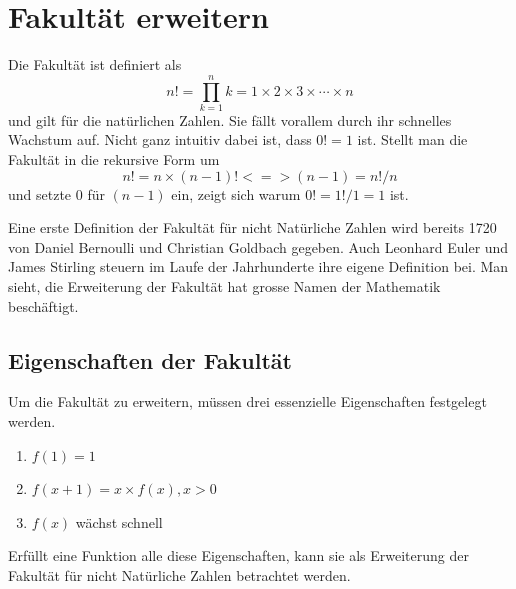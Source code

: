 %
%
%
%
\section{Fakultät erweitern\label{gamma:section:teil0}}

Die Fakultät ist definiert als
\begin{equation}
n! = \prod_{k=1}^{n} k = 1 \times 2 \times 3 \times \cdots \times n
\label{gamma:fakultaet}
\end{equation}
und gilt für die natürlichen Zahlen. Sie fällt vorallem durch ihr schnelles Wachstum auf.
Nicht ganz intuitiv dabei ist, dass $0! = 1$ ist. Stellt man die Fakultät in die rekursive Form um
\begin{equation}
n! = n \times (n-1)! <=> (n-1) = n!/n
\label{gamma:fakultaet-rekursiv}
\end{equation}
und setzte 0 für $(n-1)$ ein, zeigt sich warum $0! = 1!/1 = 1$ ist. 

Eine erste Definition der Fakultät für nicht Natürliche Zahlen wird bereits 1720 von Daniel Bernoulli und Christian Goldbach gegeben. 
Auch Leonhard Euler und James Stirling steuern im Laufe der Jahrhunderte ihre eigene Definition bei. 
Man sieht, die Erweiterung der Fakultät hat grosse Namen der Mathematik beschäftigt. 

\subsection{Eigenschaften der Fakultät}

Um die Fakultät zu erweitern, müssen drei essenzielle Eigenschaften festgelegt werden. 
\begin{enumerate}
  \item $f(1) = 1$
  \item $f(x+1) = x \times f(x), x > 0$
  \item $f(x)$ wächst schnell
\end{enumerate}
Erfüllt eine Funktion alle diese Eigenschaften, kann sie als Erweiterung der Fakultät für nicht Natürliche Zahlen betrachtet werden.


